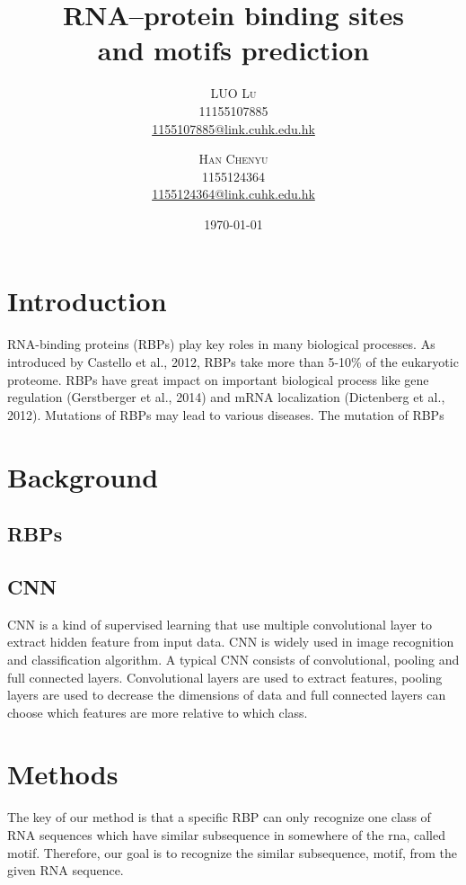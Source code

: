 \documentclass[twoside,twocolumn]{article}
\title{RNA–protein binding sites \\ and motifs prediction} %
\author{%
\textsc{LUO Lu} \\[1ex] %
\normalsize 11155107885 \\ %
\normalsize \href{mailto:1155107885@link.cuhk.edu.hk}{1155107885@link.cuhk.edu.hk}
\and
\textsc{Han Chenyu}\\[1ex] %
\normalsize 1155124364 \\ %
\normalsize \href{mailto:1155124364@link.cuhk.edu.hk}{1155124364@link.cuhk.edu.hk} %
}
\date{\today} %
\begin{document}
\maketitle


\section{Introduction}

\lettrine[nindent=0em,lines=3]{R} NA-binding proteins (RBPs) play key roles in 
many biological processes. As introduced by Castello et al., 2012, RBPs take more than 
5-10\% of the eukaryotic proteome. RBPs have great impact on important biological
process like gene regulation (Gerstberger et al., 2014) and mRNA localization
(Dictenberg et al., 2012). Mutations of RBPs may lead to various diseases. The 
mutation of RBPs 


\section{Background}
    \subsection{RBPs}
    \subsection{CNN}
    
    CNN is a kind of supervised learning that use multiple convolutional layer to extract hidden feature from input data. CNN is widely used in image recognition and classification algorithm. A typical CNN consists of convolutional, pooling and full connected layers. Convolutional layers are used to extract features, pooling layers are used to decrease the dimensions of data and full connected layers can choose which features are more relative to which class.
    
\section{Methods}

The key of our method is that a specific RBP can only recognize one class of RNA sequences which have similar subsequence in somewhere of the rna, called motif. Therefore, our goal is to recognize the similar subsequence, motif, from the given RNA sequence. 
\end{document}
